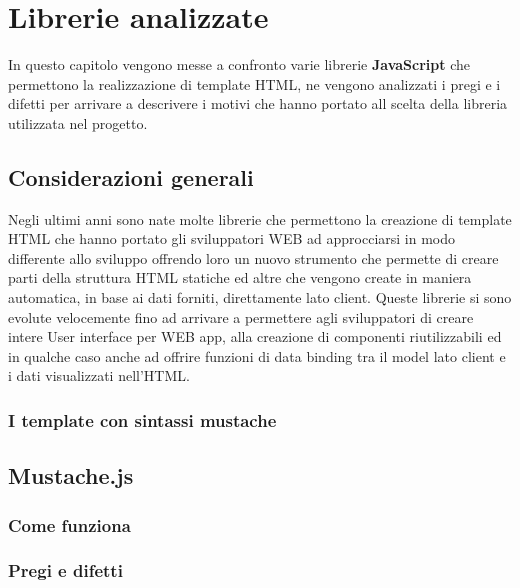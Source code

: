 
\chapter{Librerie analizzate}
\label{cap:librerie-analizzate}
In questo capitolo vengono messe a confronto varie librerie \textbf{JavaScript} che permettono la realizzazione di template HTML, ne vengono analizzati i pregi e i difetti per arrivare a descrivere i motivi che hanno portato all scelta della libreria utilizzata nel progetto.

\section{Considerazioni generali}
Negli ultimi anni sono nate molte librerie che permettono la creazione di template HTML che hanno portato gli sviluppatori WEB ad approcciarsi in modo differente allo sviluppo offrendo loro un nuovo strumento che permette di creare parti della struttura HTML statiche ed altre che vengono create in maniera automatica, in base ai dati forniti, direttamente lato client.
Queste librerie si sono evolute velocemente fino ad arrivare a permettere agli sviluppatori di creare intere User interface per WEB app, alla creazione di componenti riutilizzabili ed in qualche caso anche ad offrire funzioni di data binding tra il model lato client e i dati visualizzati nell'HTML.

\subsection{I template con sintassi mustache}

\section{Mustache.js}

\subsection{Come funziona}

\subsection{Pregi e difetti}

